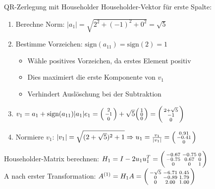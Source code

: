 \begin{example2}[breakable]{QR-Zerlegung mit Householder}
Householder-Vektor für erste Spalte:
\begin{enumerate}
    \item Berechne Norm: $|a_1| = \sqrt{2^2 + (-1)^2 + 0^2} = \sqrt{5}$
    \vspace{1mm}
    \item Bestimme Vorzeichen: $\text{sign}(a_{11}) = \text{sign}(2) = 1$
         \begin{itemize}
              \item Wähle positives Vorzeichen, da erstes Element positiv
              \item Dies maximiert die erste Komponente von $v_1$
              \item Verhindert Auslöschung bei der Subtraktion
         \end{itemize}
         \vspace{1mm}
    \item $v_1 = a_1 + \text{sign}(a_{11})|a_1|e_1 = \begin{psmallmatrix} 2\\ -1\\ 0 \end{psmallmatrix} + \sqrt{5}\begin{psmallmatrix} 1\\ 0\\ 0 \end{psmallmatrix} = \begin{psmallmatrix} 2 + \sqrt{5}\\ -1\\ 0 \end{psmallmatrix}$
    \vspace{1mm}
    \item Normiere $v_1$: $|v_1| = \sqrt{(2 + \sqrt{5})^2 + 1} \Rightarrow
            u_1 = \frac{v_1}{|v_1|} = \begin{psmallmatrix} 0.91\\ -0.41\\ 0 \end{psmallmatrix}$
\end{enumerate}
\vspace{1mm}
Householder-Matrix berechnen:
$H_1 = I - 2u_1u_1^T = \begin{psmallmatrix} 
-0.67 & -0.75 & 0\\
-0.75 & 0.67 & 0\\
0 & 0 & 1
\end{psmallmatrix}$
\vspace{1mm}\\
A nach erster Transformation:
$A^{(1)} = H_1A = \begin{psmallmatrix}
-\sqrt{5} & -6.71 & 0.45\\
0 & -0.89 & 1.79\\
0 & 2.00 & 1.00
\end{psmallmatrix}$


\end{example2}
